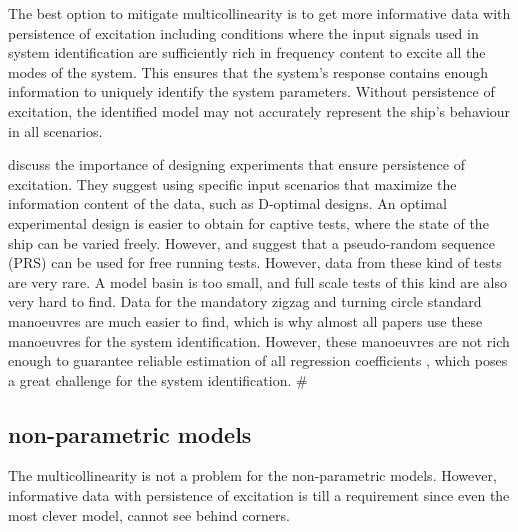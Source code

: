 The best option to mitigate multicollinearity is to get more informative data with persistence of excitation including conditions where the input signals used in system identification are sufficiently rich in frequency content to excite all the modes of the system. This ensures that the system's response contains enough information to uniquely identify the system parameters. Without persistence of excitation, the identified model may not accurately represent the ship's behaviour in all scenarios.

\cite{yoonIdentificationHydrodynamicCoefficients2003} discuss the importance of designing experiments that ensure persistence of excitation. They suggest using specific input scenarios that maximize the information content of the data, such as D-optimal designs. An optimal experimental design is easier to obtain for captive tests, where the state of the ship can be varied freely. However, \cite{wangOptimalDesignExcitation2020} and  \cite{millerShipModelIdentification2021} suggest that a pseudo-random sequence (PRS) can be used for free running tests.  However, data from these kind of tests are very rare. A model basin is too small, and full scale tests of this kind are also very hard to find. 
Data for the mandatory zigzag and turning circle standard manoeuvres \cite{imoStandardsShipManoeuvrability2002} are much easier to find, which is why almost all papers use these manoeuvres for the system identification. However, these manoeuvres are not rich enough to guarantee reliable estimation of all regression coefficients \cite{sutuloAlgorithmOfflineIdentification2014}, which poses a great challenge for the system identification.
#\subsection{non-parametric models}
The multicollinearity is not a problem for the non-parametric models. However, informative data with persistence of excitation is till a requirement since even the most clever model, cannot see behind corners. 